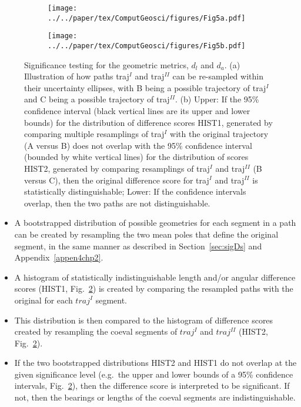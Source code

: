 \begin{figure*}[!ht]
  \captionsetup[subfigure]{singlelinecheck=off,justification=raggedright,aboveskip=-6pt,belowskip=-6pt}
  \centering
  \begin{subfigure}[htbp]{.495\textwidth}
    \centering
    \caption{}\label{fig:Fig5a}
    \texttt{[image: ../../paper/tex/ComputGeosci/figures/Fig5a.pdf]}
  \end{subfigure}
  \begin{subfigure}[htbp]{.495\textwidth}
    \centering
    \caption{}\label{fig:Fig5b}
    \texttt{[image: ../../paper/tex/ComputGeosci/figures/Fig5b.pdf]}
  \end{subfigure}
\caption[Testing on geometry]{Significance testing for the geometric metrics,
$d_l$ and $d_a$. (a) Illustration of how paths traj$^I$ and traj$^{II}$ can be
re-sampled within their uncertainty ellipses, with B being a possible
trajectory of traj$^I$ and C being a possible trajectory of traj$^{II}$. (b)
Upper: If the 95\% confidence interval (black vertical lines are its upper and
lower bounds) for the distribution of difference scores HIST1, generated by
comparing multiple resamplings of traj$^I$ with the original trajectory (A versus B)
does not overlap with the 95\% confidence interval (bounded by white vertical
lines) for the distribution of scores HIST2, generated by comparing resamplings
of traj$^I$ and traj$^{II}$ (B versus C), then the original difference score for
traj$^I$ and traj$^{II}$ is statistically distinguishable; Lower: If the
confidence intervals overlap, then the two paths are not
distinguishable.}\label{fig:Fig5}
\end{figure*}

\begin{itemize}
\item A bootstrapped distribution of possible geometries for each segment in a
  path can be created by resampling the two mean poles that define the original
  segment, in the same manner as described in Section~\ref{sec:sigDs} and
  Appendix~\ref{appen4chp2}.
\item A histogram of statistically indistinguishable length and/or angular
  difference scores (HIST1, Fig.~\ref{fig:Fig5b}) is created by comparing the
  resampled paths with the original for each $traj^I$ segment.
\item This distribution is then compared to the histogram of difference scores
  created by resampling the coeval segments of $traj^I$ and $traj^{II}$ (HIST2,
  Fig.~\ref{fig:Fig5b}).
\item If the two bootstrapped distributions HIST2 and HIST1 do not overlap at
  the given significance level (e.g.\ the upper and lower bounds of a 95\%
  confidence intervals, Fig.~\ref{fig:Fig5b}), then the difference score is
  interpreted to be significant. If not, then the bearings or lengths of the
  coeval segments are indistinguishable.
\end{itemize}

